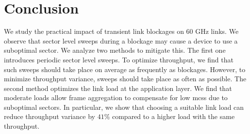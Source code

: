 \documentclass{article}
\begin{document}
\section{Conclusion}
\label{sec:conc}

We study the practical impact of transient link blockages on 60 GHz links. We observe that sector level sweeps during a blockage may cause a device to use a suboptimal sector. We analyze two methods to mitigate this. The first one introduces periodic sector level sweeps. To optimize throughput, we find that such sweeps should take place on average as frequently as blockages. However, to minimize throughput variance, sweeps should take place as often as possible. The second method optimizes the link load at the application layer. We find that moderate loads allow frame aggregation to compensate for low \acp{mcs} due to suboptimal sectors. In particular, we show that choosing a suitable link load can reduce throughput variance by $41\%$ compared to a higher load with the same throughput.








\end{document}
